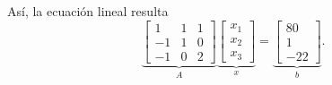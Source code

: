 \begin{frame}
\begin{solution}
\begin{enumerate}[a)]
			      Así, la ecuación lineal resulta
			      \begin{equation*}
				      \underbrace{
					      \begin{bmatrix}
						      1  & 1 & 1 \\
						      -1 & 1 & 0 \\
						      -1 & 0 & 2
					      \end{bmatrix}
				      }_{\displaystyle A}
				      \underbrace{
					      \begin{bmatrix}
						      x_{1} \\
						      x_{2} \\
						      x_{3}
					      \end{bmatrix}
				      }_{\displaystyle x}
				      =
				      \underbrace{
					      \begin{bmatrix}
						      80 \\
						      1  \\
						      -22
					      \end{bmatrix}
				      }_{\displaystyle b}.
			      \end{equation*}
		\end{enumerate}
	\end{solution}
\end{frame}

